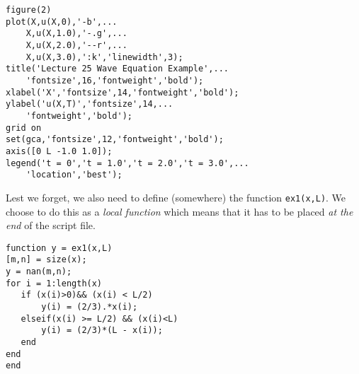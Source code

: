 \begin{lstlisting}[style=myMatlab, name=lec25-ex2]
%% fixed plot, multiple data series
figure(2)
plot(X,u(X,0),'-b',...
    X,u(X,1.0),'-.g',...
    X,u(X,2.0),'--r',...
    X,u(X,3.0),':k','linewidth',3);
title('Lecture 25 Wave Equation Example',...
    'fontsize',16,'fontweight','bold');
xlabel('X','fontsize',14,'fontweight','bold');
ylabel('u(X,T)','fontsize',14,...
    'fontweight','bold');
grid on
set(gca,'fontsize',12,'fontweight','bold');
axis([0 L -1.0 1.0]);
legend('t = 0','t = 1.0','t = 2.0','t = 3.0',...
    'location','best');
\end{lstlisting}

\vspace{1.0cm}

\noindent Lest we forget, we also need to define (somewhere) the function \lstinline[style=myMatlab]{ex1(x,L)}.  We choose to do this as a \emph{local function} which means that it has to be placed \emph{at the end} of the script file.

\begin{lstlisting}[style=myMatlab, name=lec25-ex2]
%% Local functions
function y = ex1(x,L)
[m,n] = size(x);
y = nan(m,n);
for i = 1:length(x)
   if (x(i)>0)&& (x(i) < L/2)
       y(i) = (2/3).*x(i);
   elseif(x(i) >= L/2) && (x(i)<L)
       y(i) = (2/3)*(L - x(i));
   end
end
end
\end{lstlisting}
